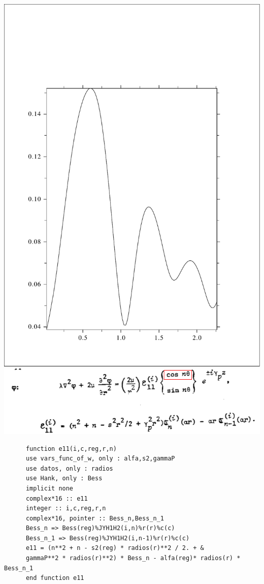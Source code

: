 \documentclass [11pt,spanish]{article}
\begin{document}
\includegraphics[scale=0.4]{RES_2s_tt2abspi.pdf}\includegraphics[scale=0.5]{e11}
\begingroup
\fontsize{10pt}{12pt}
\selectfont
{}
\begin{shaded}
\begin{verbatim}
      function e11(i,c,reg,r,n)
      use vars_func_of_w, only : alfa,s2,gammaP
      use datos, only : radios
      use Hank, only : Bess
      implicit none
      complex*16 :: e11
      integer :: i,c,reg,r,n
      complex*16, pointer :: Bess_n,Bess_n_1
      Bess_n => Bess(reg)%JYH1H2(i,n)%r(r)%c(c)
      Bess_n_1 => Bess(reg)%JYH1H2(i,n-1)%r(r)%c(c)
      e11 = (n**2 + n - s2(reg) * radios(r)**2 / 2. + & 
      gammaP**2 * radios(r)**2) * Bess_n - alfa(reg)* radios(r) * Bess_n_1
      end function e11
\end{verbatim}
\end{shaded}
\end{document}
